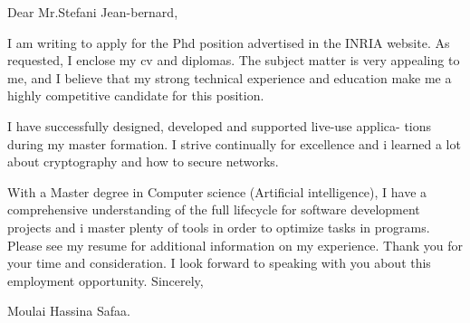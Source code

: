 \documentclass[11pt,a4paper]{report}
\begin{document}



Dear Mr.Stefani Jean-bernard,

I am writing to apply for the Phd position advertised in the INRIA
website. As requested, I enclose my cv and diplomas.
The subject matter is very appealing to me, and I believe that my strong
technical experience and education make me a highly competitive candidate
for this position.


I have successfully designed, developed and supported live-use applica-
tions during my master formation.
I strive continually for excellence and i learned a lot about cryptography
and how to secure networks.


With a Master degree in Computer science (Artificial intelligence), I have
a comprehensive understanding of the full lifecycle for software development
projects and i master plenty of tools in order to optimize tasks in programs.
Please see my resume for additional information on my experience.
Thank you for your time and consideration. I look forward to speaking
with you about this employment opportunity.
Sincerely,


Moulai Hassina Safaa.
\end{document}

